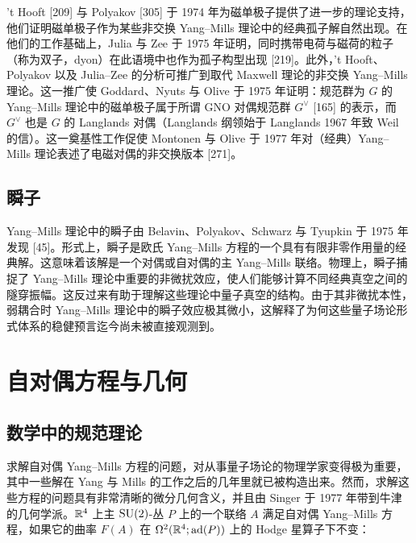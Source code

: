 't Hooft [209] 与 Polyakov [305] 于 1974 年为磁单极子提供了进一步的理论支持，他们证明磁单极子作为某些非交换 Yang--Mills 理论中的经典孤子解自然出现。在他们的工作基础上，Julia 与 Zee 于 1975 年证明，同时携带电荷与磁荷的粒子（称为双子，dyon）在此语境中也作为孤子构型出现 [219]。此外，'t Hooft、Polyakov 以及 Julia--Zee 的分析可推广到取代 Maxwell 理论的非交换 Yang--Mills 理论。这一推广使 Goddard、Nyuts 与 Olive 于 1975 年证明：规范群为 $G$ 的 Yang--Mills 理论中的磁单极子属于所谓 GNO 对偶规范群 $G^\vee$ [165] 的表示，而 $G^\vee$ 也是 $G$ 的 Langlands 对偶（Langlands 纲领始于 Langlands 1967 年致 Weil 的信）。这一奠基性工作促使 Montonen 与 Olive 于 1977 年对（经典）Yang--Mills 理论表述了电磁对偶的非交换版本 [271]。

\subsection*{瞬子}

Yang--Mills 理论中的瞬子由 Belavin、Polyakov、Schwarz 与 Tyupkin 于 1975 年发现 [45]。形式上，瞬子是欧氏 Yang--Mills 方程的一个具有有限非零作用量的经典解。这意味着该解是一个对偶或自对偶的主 Yang--Mills 联络。物理上，瞬子捕捉了 Yang--Mills 理论中重要的非微扰效应，使人们能够计算不同经典真空之间的隧穿振幅。这反过来有助于理解这些理论中量子真空的结构。由于其非微扰本性，弱耦合时 Yang--Mills 理论中的瞬子效应极其微小，这解释了为何这些量子场论形式体系的稳健预言迄今尚未被直接观测到。

\section*{自对偶方程与几何}

\subsection*{数学中的规范理论}

求解自对偶 Yang--Mills 方程的问题，对从事量子场论的物理学家变得极为重要，其中一些解在 Yang 与 Mills 的工作之后的几年里就已被构造出来。然而，求解这些方程的问题具有非常清晰的微分几何含义，并且由 Singer 于 1977 年带到牛津的几何学派。$\mathbb{R}^4$ 上主 $\operatorname{SU}(2)$-丛 $P$ 上的一个联络 $A$ 满足自对偶 Yang--Mills 方程，如果它的曲率 $F(A)$ 在 $\Omega^2(\mathbb{R}^4;\operatorname{ad}(P))$ 上的 Hodge 星算子下不变：

